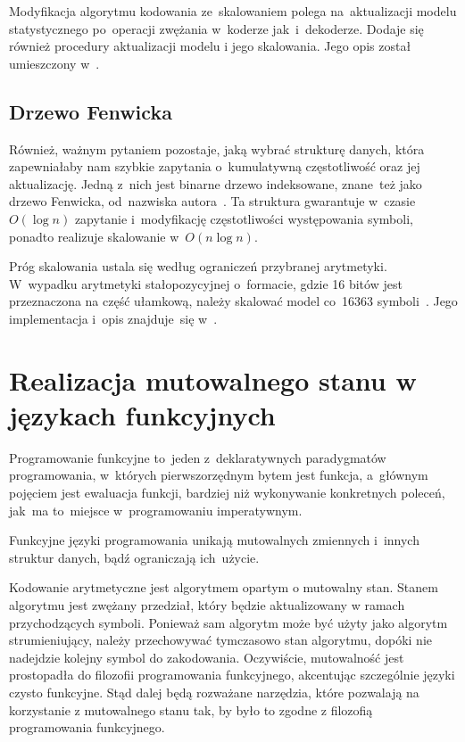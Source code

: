 \documentclass[../../praca.tex]{subfiles}
\begin{document}
Modyfikacja algorytmu kodowania ze~skalowaniem polega na~aktualizacji
modelu statystycznego po~operacji zwężania w~koderze jak~i~dekoderze.
Dodaje się również procedury aktualizacji modelu i jego skalowania.
Jego opis został umieszczony w~\cite{Sayood:IDC}.

\subsection{Drzewo Fenwicka}

Również, ważnym pytaniem pozostaje, jaką wybrać strukturę danych, która
zapewniałaby nam szybkie zapytania o~kumulatywną częstotliwość oraz
jej aktualizację. Jedną z~nich jest binarne drzewo indeksowane, 
znane~też jako drzewo Fenwicka, od~nazwiska autora~\cite{Fenwick:FT}.
Ta struktura gwarantuje w~czasie~\( O (\log n) \) zapytanie i~modyfikację
częstotliwości występowania symboli, ponadto realizuje skalowanie w~\( O (n \log n) \).

Próg skalowania ustala się według ograniczeń przybranej arytmetyki. 
W~wypadku arytmetyki stałopozycyjnej o~formacie, gdzie 16 bitów jest przeznaczona 
na część ułamkową, należy skalować
model co~16363 symboli~\cite{Fenwick:FT}.
Jego implementacja i~opis znajduje~się w~\cite{Fenwick:FT}.

\section{Realizacja mutowalnego stanu w językach funkcyjnych}

Programowanie funkcyjne to~jeden z~deklaratywnych paradygmatów programowania,
w~których pierwszorzędnym bytem jest funkcja, a~głównym pojęciem
jest ewaluacja funkcji, bardziej niż wykonywanie konkretnych poleceń,
jak~ma to~miejsce w~programowaniu imperatywnym.~\cite{Hudak:Conception}

Funkcyjne języki programowania unikają mutowalnych zmiennych i~innych 
struktur danych, bądź ograniczają ich~użycie.

Kodowanie arytmetyczne jest algorytmem opartym o mutowalny stan.
Stanem algorytmu jest zwężany przedział, który będzie aktualizowany
w ramach przychodzących symboli. Ponieważ sam algorytm może być użyty
jako algorytm strumieniujący, należy przechowywać tymczasowo stan algorytmu,
dopóki nie nadejdzie kolejny symbol do zakodowania. Oczywiście, mutowalność
jest prostopadła do filozofii programowania funkcyjnego, akcentując szczególnie
języki czysto funkcyjne. Stąd dalej będą rozważane narzędzia, które pozwalają
na korzystanie z mutowalnego stanu tak, by było to zgodne z filozofią programowania
funkcyjnego.
\end{document}
